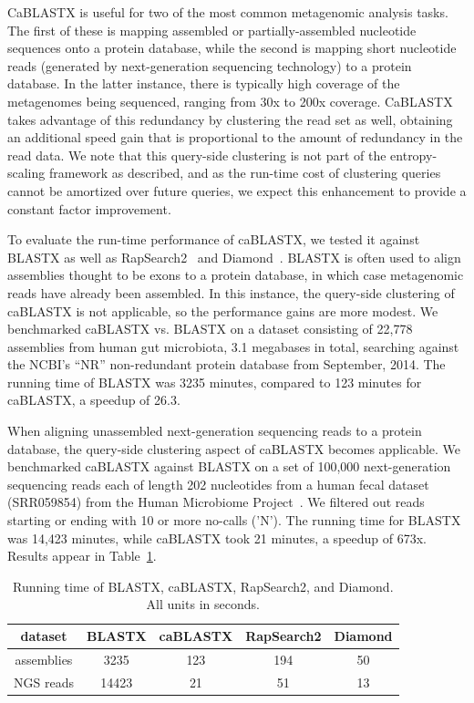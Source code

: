\documentclass[review,preprint,12pt]{elsarticle}
\renewcommand{\cite}{\citep} %
\theoremstyle{definition}
\theoremstyle{remark}
\numberwithin{equation}{section}
\begin{document}
CaBLASTX is useful for two of the most common metagenomic analysis tasks. 
The first of these is mapping assembled or partially-assembled
nucleotide sequences onto a protein database,
while the second is mapping short nucleotide reads (generated by next-generation
sequencing technology) to a protein database.
In the latter instance, there is typically high coverage of the metagenomes
being sequenced, ranging from 30x to 200x coverage.
CaBLASTX takes advantage of this redundancy
by clustering the read set as well, obtaining an additional speed gain that is
proportional to the amount of redundancy in the read data.
We note that this query-side clustering is not part of the entropy-scaling
framework as described, and as the run-time cost of clustering queries cannot
be amortized over future queries, we expect this enhancement to provide a 
constant factor improvement.

To evaluate the run-time performance of caBLASTX, we tested it against
BLASTX as well as RapSearch2~\cite{zhao2012rapsearch2} and
Diamond~\cite{buchfink2014fast}.
BLASTX is often used to align assemblies thought to be exons to a protein
database, in which case metagenomic reads have already been assembled.
In this instance, the query-side clustering of caBLASTX is not applicable, so
the performance gains are more modest.
We benchmarked caBLASTX vs. BLASTX on a dataset consisting of 22,778 assemblies
from human gut microbiota, 3.1 megabases in total, searching against the NCBI's
``NR'' non-redundant protein database from September, 2014.
The running time of BLASTX was 3235 minutes, compared to 123 minutes for 
caBLASTX, a speedup of 26.3.

When aligning unassembled next-generation sequencing reads to a protein 
database, the
query-side clustering aspect of caBLASTX becomes applicable.
We benchmarked caBLASTX against BLASTX on a set of 100,000
next-generation sequencing reads each of length 202 nucleotides from a human 
fecal dataset (SRR059854) from the
Human Microbiome Project~\cite{turnbaugh2007human}.
We filtered out reads starting or ending with 10 or more no-calls ('N').
The running time for BLASTX was 14,423 minutes, 
while caBLASTX took 21 minutes, a speedup of 673x.
Results appear in Table~\ref{mgspeed}.



\begin{table}
\caption{Running time of BLASTX, caBLASTX, RapSearch2, and Diamond. All units in seconds.\label{mgspeed}}
\begin{tabular}{ccccc}
\hline
dataset & BLASTX & caBLASTX & RapSearch2 & Diamond \\
\hline
assemblies & 3235 & 123 & 194 & 50 \\
\hline
NGS reads & 14423 & 21 & 51 & 13 \\
\hline
\end{tabular}
\end{table}
\end{document}
